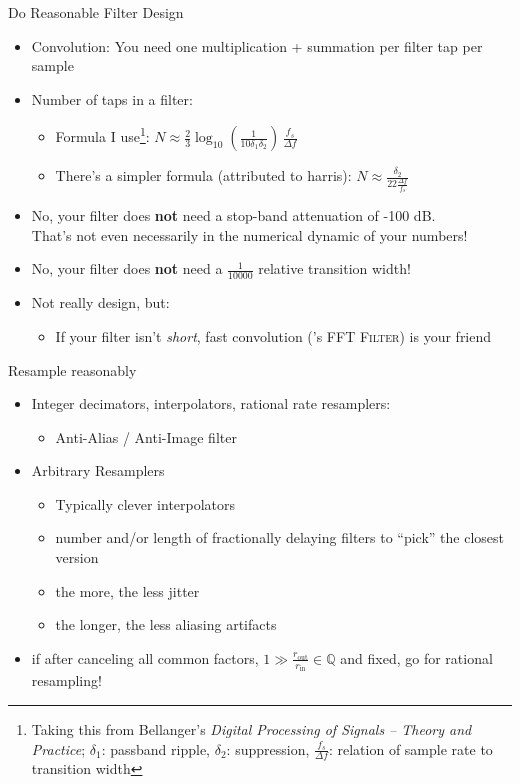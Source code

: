\begin{frame}{Do Reasonable Filter Design}
  \begin{itemize}
    \item Convolution: You need one multiplication + summation per filter tap
      per sample
    \item Number of taps in a filter:
      \begin{itemize}
    \item Formula I use\footnote{Taking this from  Bellanger's \textit{Digital Processing of Signals – Theory and Practice}; $\delta_1$: passband ripple, $\delta_2$:
        suppression, $\frac{f_s}{\Delta f}$: relation of sample rate to
        transition width}: $N\approx \frac 23 \log_{10} \left( \frac1{10
          \delta_1\delta_2}\right)\,\frac{f_s}{\Delta f}$
    \item There's a simpler formula (attributed to harris):
      $N\approx\frac{\delta_2}{22\frac{\Delta f}{f_s}}$
      \end{itemize}
    \item No, your filter does \textbf{not} need a stop-band attenuation of
      -100 dB.\\That's not even necessarily in the numerical dynamic of your
      numbers!
    \item No, your filter does \textbf{not} need a $\frac1{10000}$
      relative transition width!
    \item Not really design, but:
      \begin{itemize}
      \item If your filter isn't \textit{short}, fast convolution (\GR's
        \textsc{FFT Filter}) is your friend
      \end{itemize}
    \end{itemize}
\end{frame}
\begin{frame}{Resample reasonably}
    \begin{itemize}
    \item Integer decimators, interpolators, rational rate resamplers:
      \begin{itemize}
      \item Anti-Alias / Anti-Image filter
      \end{itemize}
    \item Arbitrary Resamplers
      \begin{itemize}
      \item Typically clever interpolators
        \item number and/or length of fractionally delaying filters to ``pick''
          the closest version
        \item the more, the less jitter
        \item the longer, the less aliasing artifacts
        \end{itemize}
        \item if after canceling all common factors, $1\gg\frac{r_\text{out}}{r_\text{in}}\in \mathbb Q$ and fixed, go for rational
          resampling!
    \end{itemize}
\end{frame}
